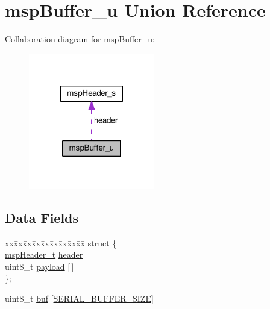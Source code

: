 \hypertarget{unionmspBuffer__u}{\section{msp\+Buffer\+\_\+u Union Reference}
\label{unionmspBuffer__u}
}


Collaboration diagram for msp\+Buffer\+\_\+u\+:\nopagebreak
\begin{figure}[H]
\begin{center}
\leavevmode
\includegraphics[width=156pt]{unionmspBuffer__u__coll__graph}
\end{center}
\end{figure}
\subsection*{Data Fields}
\begin{DoxyCompactItemize}
\item 
\begin{tabbing}
xx\=xx\=xx\=xx\=xx\=xx\=xx\=xx\=xx\=\kill
struct \{\\
\>\hyperlink{serial__msp__unittest_8cc_aa4cf20b7363cc9e4acb075c5211a2842}{mspHeader\_t} \hyperlink{unionmspBuffer__u_ace384d3e7e735ad32e9753be0f49e51d}{header}\\
\>uint8\_t \hyperlink{unionmspBuffer__u_a2b4ff5b9f14ac0b5730ffc6f81799640}{payload} \mbox{[}$\,$\mbox{]}\\
\}; \\

\end{tabbing}\item 
uint8\+\_\+t \hyperlink{unionmspBuffer__u_ae36bb9e208f32a962146f743f176ea03}{buf} \mbox{[}\hyperlink{serial__msp__unittest_8cc_aaa07390e6158db5d82d40510d2ae02d5}{S\+E\+R\+I\+A\+L\+\_\+\+B\+U\+F\+F\+E\+R\+\_\+\+S\+I\+Z\+E}\mbox{]}
\end{DoxyCompactItemize}


